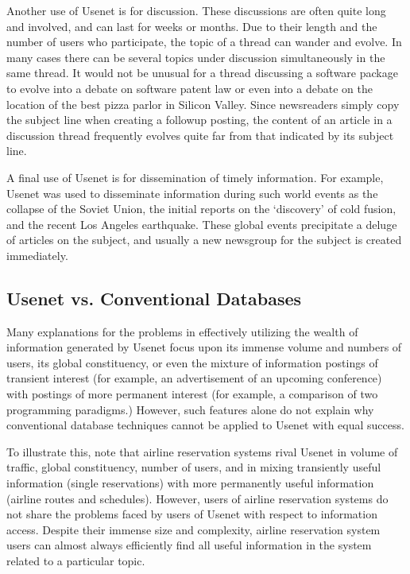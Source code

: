 Another use of Usenet is for discussion. These discussions are often quite long
and involved, and can last for weeks or months. Due to their length and the
number of users who participate, the topic of a thread can wander and evolve.
In many cases there can be several topics under discussion simultaneously in
the same thread. It would not be unusual for a thread discussing a software
package to evolve into a debate on software patent law or even into a debate on
the location of the best pizza parlor in Silicon Valley.  Since newsreaders
simply copy the subject line when creating a followup posting, the content of
an article in a discussion thread frequently evolves quite far from that
indicated by its subject line.

A final use of Usenet is for dissemination of timely information. For
example, Usenet was used to disseminate information during such world
events as the collapse of the Soviet Union, the initial reports on the
`discovery' of cold fusion, and the recent Los Angeles earthquake.  These
global events precipitate a deluge of articles on the subject, and usually
a new newsgroup for the subject is created immediately.

\subsection{Usenet vs. Conventional Databases}

Many explanations for the problems in effectively utilizing the wealth of
information generated by Usenet focus upon its immense volume and numbers of
users, its global constituency, or even the mixture of information postings of
transient interest (for example, an advertisement of an upcoming conference)
with postings of more permanent interest (for example, a comparison of two
programming paradigms.)  However, such features alone do not explain why
conventional database techniques cannot be applied to Usenet with equal
success.

To illustrate this, note that airline reservation systems rival Usenet in
volume of traffic, global constituency, number of users, and in mixing
transiently useful information (single reservations) with more permanently
useful information (airline routes and schedules).  However, users of airline
reservation systems do not share the problems faced by users of Usenet with
respect to information access.  Despite their immense size and complexity,
airline reservation system users can almost always efficiently find all useful
information in the system related to a particular topic.

